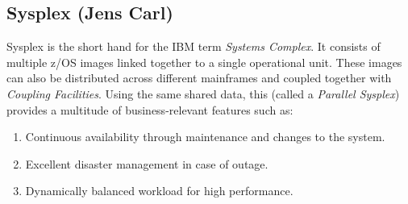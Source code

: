 \subsection{Sysplex (Jens Carl)}
Sysplex is the short hand for the IBM term \textit{Systems Complex}. It consists of multiple z/OS images linked together to a single operational unit. These images can also be distributed across different mainframes and coupled together with  \textit{Coupling Facilities}. Using the same shared data, this (called a \textit{Parallel Sysplex}) provides a multitude of business-relevant features such as:
\begin{enumerate}
    \item Continuous availability through maintenance and changes to the system. 
    \item Excellent disaster management in case of outage.
    \item Dynamically balanced workload for high performance. 
\end{enumerate}